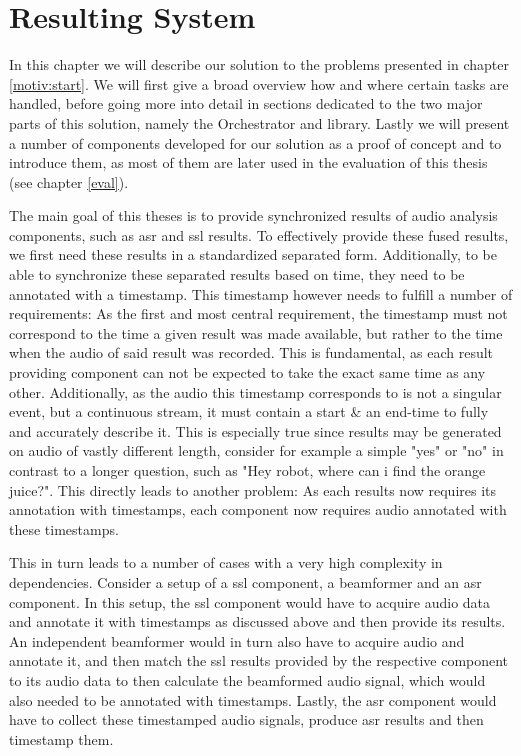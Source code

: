 \chapter{Resulting System}
In this chapter we will describe our solution to the problems presented in chapter \ref{motiv:start}.
We will first give a broad overview how and where certain tasks are handled, before going more into detail in sections dedicated to the two major parts of this solution, namely the Orchestrator and library.
Lastly we will present a number of components developed for our solution as a proof of concept and to introduce them, as most of them are later used in the evaluation of this thesis (see chapter \ref{eval}).

The main goal of this theses is to provide synchronized results of audio analysis components, such as \gls{asr} and \gls{ssl} results.
To effectively provide these fused results, we first need these results in a standardized separated form.
Additionally, to be able to synchronize these separated results based on time, they need to be annotated with a timestamp.
This timestamp however needs to fulfill a number of requirements:
As the first and most central requirement, the timestamp must not correspond to the time a given result was made available, but rather to the time when the audio of said result was recorded.
This is fundamental, as each result providing component can not be expected to take the exact same time as any other.
Additionally, as the audio this timestamp corresponds to is not a singular event, but a continuous stream, it must contain a start \& an end-time to fully and accurately describe it.
This is especially true since results may be generated on audio of vastly different length, consider for example a simple "yes" or "no" in contrast to a longer question, such as "Hey robot, where can i find the orange juice?".
This directly leads to another problem:
As each results now requires its annotation with timestamps, each component now requires audio annotated with these timestamps.

This in turn leads to a number of cases with a very high complexity in dependencies.
Consider a setup of a \gls{ssl} component, a beamformer and an \gls{asr} component.
In this setup, the \gls{ssl} component would have to acquire audio data and annotate it with timestamps as discussed above and then provide its results.
An independent beamformer would in turn also have to acquire audio and annotate it, and then match the \gls{ssl} results provided by the respective component to its audio data to then calculate the beamformed audio signal, which would also needed to be annotated with timestamps.
Lastly, the \gls{asr} component would have to collect these timestamped audio signals, produce \gls{asr} results and then timestamp them.

